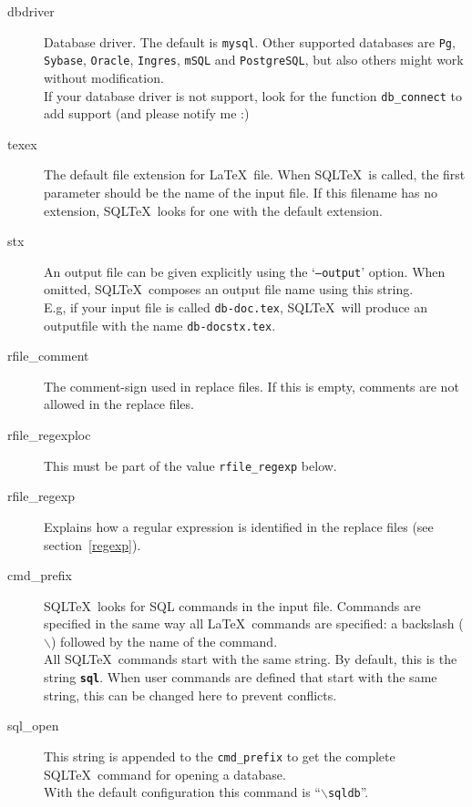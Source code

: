 \documentclass{article}
\newcommand{\bs}{\ensuremath{\backslash}}
\begin{document}
\begin{description}

\item[dbdriver] Database driver. The default is \texttt{mysql}.
Other supported databases are \texttt{Pg}, \texttt{Sybase}, \texttt{Oracle},
\texttt{Ingres}, \texttt{mSQL} and \texttt{PostgreSQL}, but also others might
work without modification. \\
If your database driver is not support, look for the function
\texttt{db\_connect} to add support (and please notify me :) 

\item[texex] The default file extension for \LaTeX\ file. When SQL\TeX\ is called, the first
parameter should be the name of the input file. If this filename has no extension,
SQL\TeX\ looks for one with the default extension.

\item[stx] An output file can be given explicitly using the `\texttt{--output}' option. When omitted,
SQL\TeX\ composes an output file name using this string.\\
E.g, if your input file is called \texttt{db-doc.tex}, SQL\TeX\ will produce an
outputfile with the name \texttt{db-docstx.tex}.

\item[rfile\_comment] The comment-sign used in replace files. If this is empty, comments are not allowed in
the replace files.

\item[rfile\_regexploc] This must be part of the value \texttt{rfile\_regexp} below. 

\item[rfile\_regexp] Explains how a regular expression is identified in the replace files (see section~\ref{regexp}). 

\item[cmd\_prefix]\label{prefix} SQL\TeX\ looks for SQL commands in the input file. Commands are specified in the
same way all \LaTeX\ commands are specified: a backslash (\bs) followed by the
name of the command.\\
All SQL\TeX\ commands start with the same string. By default, this is the string
\texttt{\textbf{sql}}. When user commands are defined that start with the same
string, this can be changed here to prevent conflicts.

\item[sql\_open] This string is appended to the \texttt{cmd\_prefix} to
get the complete SQL\TeX\ command for opening a database.\\
With the default configuration this command is ``\texttt{\bs sqldb}''.


\end{description}
\end{document}
